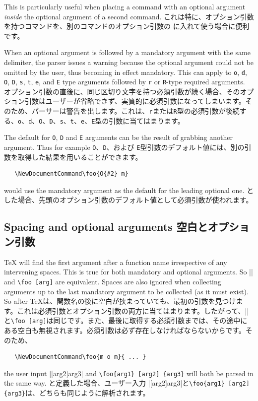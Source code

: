 \documentclass{ltxguide}
\newcommand\jpnewline{\vspace{3pt}\newline}
\DeclareRobustCommand{\jpemph}[1]{%
  \underLine{#1}%
}
\begin{document}
This is particularly useful when placing a command with an optional argument
\emph{inside} the optional argument of a second command.
\jpnewline
これは特に、オプション引数を持つコマンドを、別のコマンドのオプション引数の\jpemph{内側}に入れて使う場合に便利です。


When an optional argument is followed by a mandatory argument with the same
delimiter, the parser issues a warning because the optional argument could not
be omitted by the user, thus becoming in effect mandatory. This can apply to
\texttt{o}, \texttt{d}, \texttt{O}, \texttt{D}, \texttt{s}, \texttt{t},
\texttt{e}, and \texttt{E} type arguments followed by \texttt{r} or
\texttt{R}-type required arguments.
\jpnewline
オプション引数の直後に、同じ区切り文字を持つ必須引数が続く場合、そのオプション引数はユーザーが省略できず、実質的に必須引数になってしまいます。そのため、パーサーは警告を出します。これは、\texttt{r}または\texttt{R}型の必須引数が後続する、\texttt{o}、\texttt{d}、\texttt{O}、\texttt{D}、\texttt{s}、\texttt{t}、\texttt{e}、\texttt{E}型の引数に当てはまります。

The default for \texttt{O}, \texttt{D} and \texttt{E} arguments can be
the result of grabbing another argument. Thus for example
\jpnewline
\texttt{O}、\texttt{D}、および \texttt{E}型引数のデフォルト値には、別の引数を取得した結果を用いることができます。
\begin{verbatim}
   \NewDocumentCommand\foo{O{#2} m}
\end{verbatim}
would use the mandatory argument as the default for the leading optional
one.
\jpnewline
とした場合、先頭のオプション引数のデフォルト値として必須引数が使われます。

\subsection{Spacing and optional arguments
空白とオプション引数}
\label{sec:cmd:opt-space}

\TeX{} will find the first argument after a function name irrespective of any
intervening spaces. This is true for both mandatory and optional arguments. So
|\foo[arg]| and \verb*|\foo [arg]| are equivalent. Spaces are also ignored when
collecting arguments up to the last mandatory argument to be collected (as it
must exist). So after
\jpnewline
\TeX{}は、関数名の後に空白が挟まっていても、最初の引数を見つけます。これは必須引数とオプション引数の両方に当てはまります。したがって、|\foo[arg]|と\verb*|\foo [arg]|は同じです。また、最後に取得する必須引数までは、その途中にある空白も無視されます。必須引数は必ず存在しなければならないからです。そのため、
\begin{verbatim}
   \NewDocumentCommand\foo{m o m}{ ... }
\end{verbatim}
the user input |[arg2]{arg3}| and \verb*|\foo{arg1} [arg2] {arg3}|
will both be parsed in the same way.
\jpnewline
と定義した場合、ユーザー入力 |[arg2]{arg3}|と\verb*|\foo{arg1} [arg2] {arg3}|は、どちらも同じように解析されます。
\end{document}
